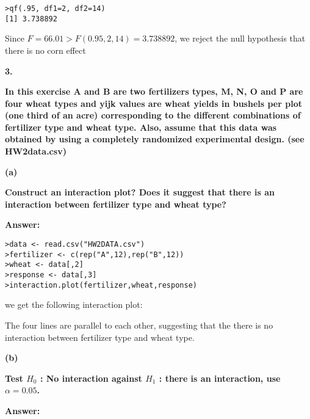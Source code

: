 \documentclass[letterpaper,11pt]{article}
\begin{document}
\begin{lstlisting}
>qf(.95, df1=2, df2=14)
[1] 3.738892
\end{lstlisting}
Since $F = 66.01 > F(0.95,2,14) = 3.738892$, we reject the null hypothesis that there is no corn effect



  \bigbreak
  \begin{addmargin}[-2em]{0em} \large{\textbf{3. }}\end{addmargin}

  \begin{addmargin}[-1.1em]{0em} \textbf{In this exercise A and B are two fertilizers types, M, N, O and P are four wheat types and yijk values are wheat yields in bushels per plot (one third of an acre) corresponding to the different combinations of fertilizer type and wheat type. Also, assume that this data was obtained by using a completely randomized experimental design. (see HW2data.csv)
}\par\end{addmargin}


    \bigbreak
    \begin{addmargin}[-1.1em]{0em}
    \textbf{(a)}\par\end{addmargin}
      \textbf{Construct an interaction plot? Does it suggest that there is an interaction between fertilizer type and wheat type?}\par
    \bigbreak

    \begin{addmargin}[-0.5em]{0em}
    \textbf{Answer:}\end{addmargin}

\begin{lstlisting}
>data <- read.csv("HW2DATA.csv")
>fertilizer <- c(rep("A",12),rep("B",12))
>wheat <- data[,2]
>response <- data[,3]
>interaction.plot(fertilizer,wheat,response)
\end{lstlisting}

we get the following interaction plot:



The four lines are parallel to each other, suggesting that the there is no interaction between fertilizer type and wheat type.

    \bigbreak
    \begin{addmargin}[-1.1em]{0em}
    \textbf{(b)}\par\end{addmargin}
      \textbf{Test $H_0$ : No interaction against $H_1$ : there is an interaction, use $\alpha = 0.05$.}\par
    \bigbreak
    \begin{addmargin}[-0.5em]{0em}
    \textbf{Answer: }\end{addmargin}
\end{document}
